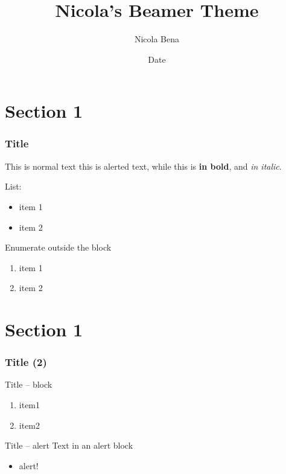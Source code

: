 \documentclass{beamer}
\title{Nicola's Beamer Theme}
\date{Date}
\author{Nicola Bena}
\begin{document}

\begin{frame}
    \titlepage
\end{frame}

\section{Section 1}

\begin{frame}
    \frametitle{Title}
    This is normal text \alert{this is alerted text}, while this is \textbf{in bold},
    and \textit{in italic}.

    List:
    \begin{itemize}
        \item item 1
        \item item 2
    \end{itemize}

    Enumerate outside the block
    \begin{enumerate}
        \item item 1
        \item item 2
    \end{enumerate}
\end{frame}

\section{Section 1}

\begin{frame}
    \frametitle{Title (2)}

    \begin{block}{Title -- block}
        \begin{enumerate}
            \item item1
            \item item2
        \end{enumerate}
    \end{block}

    \begin{alertblock}{Title -- alert}
        Text in an alert block
        \begin{itemize}
            \item \alert{alert!}
        \end{itemize}
        
    \end{alertblock}
\end{frame}

    
\end{document}
